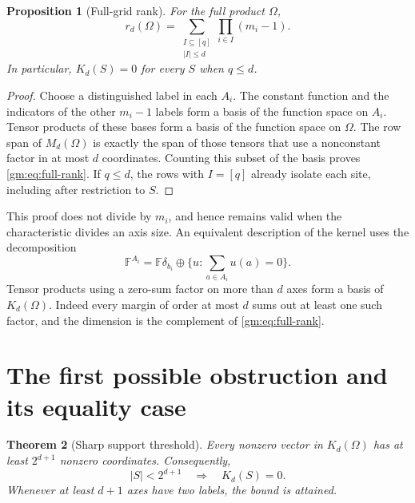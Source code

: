 \documentclass[11pt,a4paper]{article}
\numberwithin{equation}{section}
\newtheorem{theorem}{Theorem}[section]
\newtheorem{proposition}[theorem]{Proposition}
\theoremstyle{definition}
\theoremstyle{remark}
\newcommand{\F}{\mathbb F}
\newcommand{\1}{\mathbf 1}
\begin{document}
\begin{proposition}[Full-grid rank]\label{gm:prop:full-rank}
For the full product $\Omega$,
\begin{equation}\label{gm:eq:full-rank}
 r_d(\Omega)=\sum_{\substack{I\subseteq[q]\\|I|\leq d}}
                      \prod_{i\in I}(m_i-1).
\end{equation}
In particular, $K_d(S)=0$ for every $S$ when $q\leq d$.
\end{proposition}

\begin{proof}
Choose a distinguished label in each $A_i$. The constant function and the
indicators of the other $m_i-1$ labels form a basis of the function space on
$A_i$. Tensor products of these bases form a basis of the function space
on $\Omega$. The row span of $M_d(\Omega)$ is exactly the span of those
tensors that use a nonconstant factor in at most $d$ coordinates. Counting
this subset of the basis proves \eqref{gm:eq:full-rank}. If $q\leq d$, the
rows with $I=[q]$ already isolate each site, including after restriction
to $S$.
\end{proof}

This proof does not divide by $m_i$, and hence remains valid when the
characteristic divides an axis size. An equivalent description of the
kernel uses the decomposition
\[
 \F^{A_i}=\F\delta_{b_i}\oplus
       \{u:\textstyle\sum_{a\in A_i}u(a)=0\}.
\]
Tensor products using a zero-sum factor on more than $d$ axes form a basis
of $K_d(\Omega)$. Indeed every margin of order at most $d$ sums out at
least one such factor, and the dimension is the complement of
\eqref{gm:eq:full-rank}.

\section{The first possible obstruction and its equality case}
\label{gm:sec:support}

\begin{theorem}[Sharp support threshold]\label{gm:thm:support}
Every nonzero vector in $K_d(\Omega)$ has at least $2^{d+1}$ nonzero
coordinates. Consequently,
\begin{equation}\label{gm:eq:small-independent}
 |S|<2^{d+1}\quad\Longrightarrow\quad K_d(S)=0.
\end{equation}
Whenever at least $d+1$ axes have two labels, the bound is attained.
\end{theorem}
\end{document}

